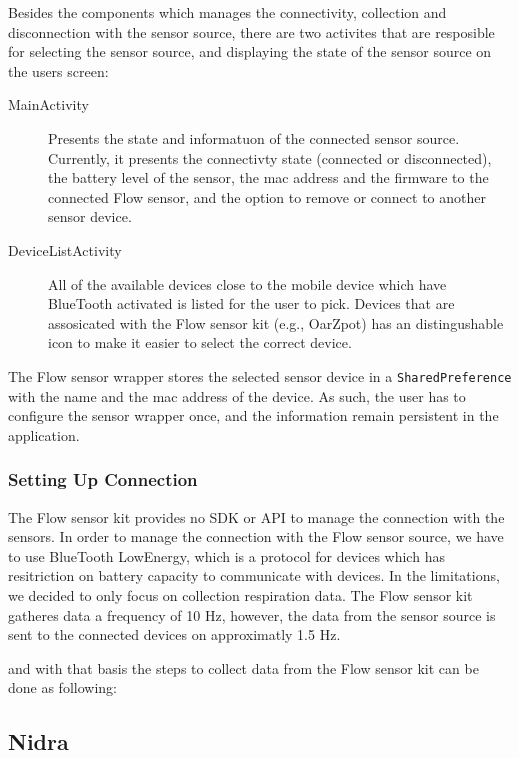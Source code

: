 Besides the components which manages the connectivity, collection and disconnection with the sensor source, there are two activites that are resposible for selecting the sensor source, and displaying the state of the sensor source on the users screen:
\begin{description}
    \item[MainActivity] Presents the state and informatuon of the connected sensor source. Currently, it presents the connectivty state (connected or disconnected), the battery level of the sensor, the mac address and the firmware to the connected Flow sensor, and the option to remove or connect to another sensor device. 
    \item[DeviceListActivity] All of the available devices close to the mobile device which have BlueTooth activated is listed for the user to pick. Devices that are assosicated with the Flow sensor kit (e.g., OarZpot) has an distingushable icon to make it easier to select the correct device. 
\end{description}
The Flow sensor wrapper stores the selected sensor device in a \verb|SharedPreference| with the name and the mac address of the device. As such, the user has to configure the sensor wrapper once, and the information remain persistent in the application.   



\subsubsection{Setting Up Connection}
The Flow sensor kit provides no SDK or API to manage the connection with the sensors. In order to manage the connection with the Flow sensor source, we have to use BlueTooth LowEnergy, which is a protocol for devices which has resitriction on battery capacity to communicate with devices. In the limitations, we decided to only focus on collection respiration data. The Flow sensor kit gatheres data a frequency of 10 Hz, however, the data from the sensor source is sent to the connected devices on approximatly 1.5 Hz. 

 and with that basis the steps to collect data from the Flow sensor kit can be done as following: 


\subsection{Nidra}

